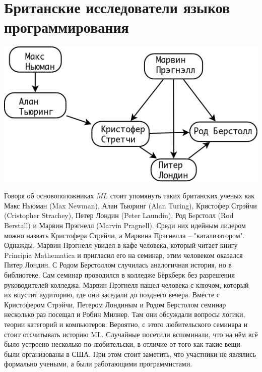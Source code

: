 \documentclass[14pt]{matmex-diploma-custom}
\begin{document}
\section{Британские исследователи языков программирования}
\includegraphics[angle=0,scale=0.4]{british.png}

Говоря об основоположниках $M\!L$ стоит упомянуть таких британских ученых как Макс Ньюман (Max Newman), Алан Тьюринг (Alan Turing), Кристофер Стрэйчи (Cristopher Strachey), Петер Лондин (Peter Laundin), Род Бeрстолл (Rod Berstall) и Марвин Прэгнелл (Marvin Pragnell). Среди них идейным лидером можно назвать Кристофера Стрейчи, а Марвина Прэгнелла -- "катализатором". Однажды, Марвин Прэгнелл увидел в кафе человека, который читает книгу Principia Mathematica \cite{russel1} и пригласил его на семинар, этим человеком оказался Питер Лондин. С Родом Берстоллом случилась аналогичная история, но в библиотеке. Сам семинар проводился в колледже Бёркберк без разрешения руководителей колледжа. Марвин Прэгнелл нашел человека с ключом, который их впустит аудиторию, где они заседали до позднего вечера. Вместе с Кристофером Стрэйчи, Петером Лондиным и Родом Берстолом семинар несколько раз посещал и Робин Милнер. Там они обсуждали вопросы логики, теории категорий и компьютеров. Вероятно, с этого любительского семинара и стоит отсчитывать историю ML. Случайные посетили вспоминали, что на нём всё было устроено несколько по-любительски, в отличие от того как такие вещи были организованы в США. При этом стоит заметить, что участники не являлись формально учеными, а были работающими программистами.
\end{document}
